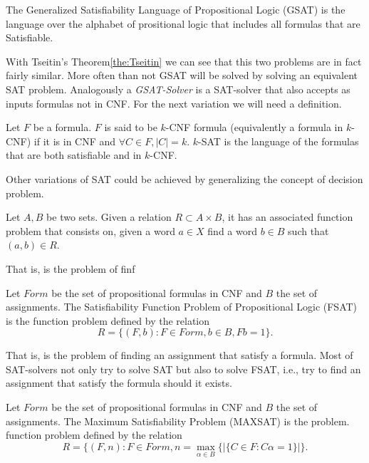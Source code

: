 \begin{definition}
\begin{definition}
  The Generalized Satisfiability Language of Propositional Logic (GSAT) is the language over the alphabet of prositional logic that includes all formulas that are Satisfiable.
\end{definition}

With Tseitin's Theorem\ref{the:Tseitin} we can see that this two problems are in fact fairly similar. More often than not GSAT will be solved by solving an equivalent SAT problem. Analogously a \emph{GSAT-Solver}  is a SAT-solver that also accepts as inputs formulas not in CNF. For the next variation we will need a definition.

\begin{definition}
  Let $F$ be a formula. $F$ is said to be $k$-CNF formula (equivalently a formula in $k$-CNF) if it is in CNF and $\forall C \in F, |C| = k$. $k$-SAT is the language of the formulas that are both satisfiable and in $k$-CNF.
\end{definition}

Other variations of SAT could be achieved by generalizing the concept of decision problem.

\begin{definition}
Let $A,B$ be two sets. Given a relation $R\subset A\times B$, it has an associated function problem that consists on, given a word $a\in X$ find a word $b\in B$ such that $(a,b)\in R$.
\end{definition}

That is, is the problem of finf

\begin{definition}
 Let $Form$ be the set of propositional formulas in CNF and $B$ the set of assignments.  The Satisfiability Function Problem of Propositional Logic (FSAT) is the function problem defined by the relation $$R=\{(F, b): F\in Form, b \in B, Fb = 1\}.$$
\end{definition}
That is, is the problem of finding an assignment that satisfy a formula. Most of SAT-solvers not only try to solve SAT but also to solve FSAT, i.e., try to find an assignment that satisfy  the formula should it exists.
\begin{definition}
 Let $Form$ be the set of propositional formulas in CNF and $B$ the set of assignments. The Maximum Satisfiability Problem (MAXSAT) is the problem. function problem defined by the relation $$R=\{(F,n) : F\in Form, n = \max_{\alpha \in B}\{ | \{C\in F : C\alpha =1 \}| \}.$$
\end{definition}


\end{definition}
